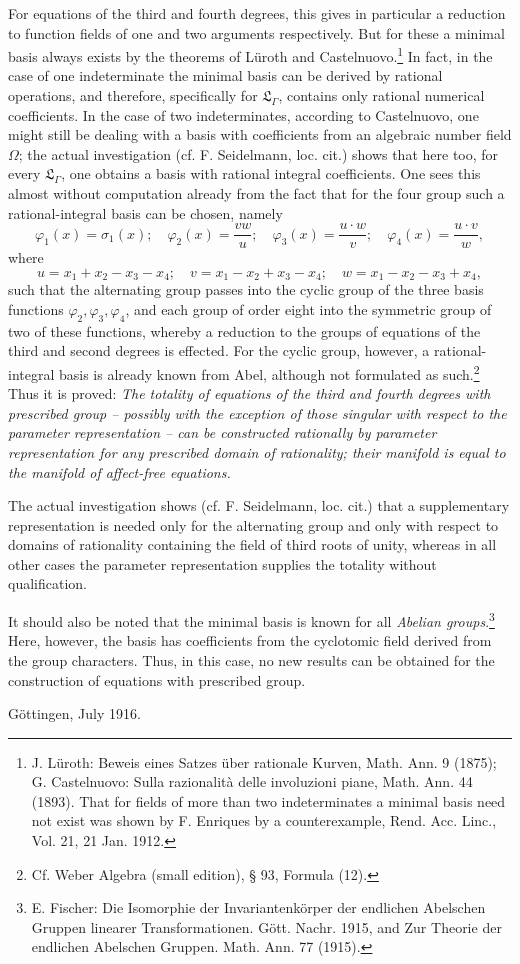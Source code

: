 \documentclass[11pt]{article}
\begin{document}
For equations of the third and fourth degrees, this gives in particular a reduction to function fields of one and two arguments respectively. But for these a minimal basis always exists by the theorems of Lüroth and Castelnuovo.\footnote{J. Lüroth: Beweis eines Satzes über rationale Kurven, Math. Ann. 9 (1875); G. Castelnuovo: Sulla razionalità delle involuzioni piane, Math. Ann. 44 (1893). That for fields of more than two indeterminates a minimal basis need not exist was shown by F. Enriques by a counterexample, Rend. Acc. Linc., Vol. 21, 21 Jan. 1912.} In fact, in the case of one indeterminate the minimal basis can be derived by rational operations, and therefore, specifically for $\mathfrak L_\Gamma$, contains only rational numerical coefficients. In the case of two indeterminates, according to Castelnuovo, one might still be dealing with a basis with coefficients from an algebraic number field $\Omega$; the actual investigation (cf. F. Seidelmann, loc. cit.) shows that here too, for every $\mathfrak L_\Gamma$, one obtains a basis with rational integral coefficients. One sees this almost without computation already from the fact that for the four group such a rational-integral basis can be chosen, namely
\[
\varphi_1(x)=\sigma_1(x);\quad \varphi_2(x)=\frac{v w}{u};\quad \varphi_3(x)=\frac{u\cdot w}{v};\quad \varphi_4(x)=\frac{u\cdot v}{w},
\]
where
\[
u=x_1+x_2-x_3-x_4;\quad v=x_1-x_2+x_3-x_4;\quad w=x_1-x_2-x_3+x_4,
\]
such that the alternating group passes into the cyclic group of the three basis functions $\varphi_2,\varphi_3,\varphi_4$, and each group of order eight into the symmetric group of two of these functions, whereby a reduction to the groups of equations of the third and second degrees is effected. For the cyclic group, however, a rational-integral basis is already known from Abel, although not formulated as such.\footnote{Cf. Weber Algebra (small edition), § 93, Formula (12).} Thus it is proved: \emph{The totality of equations of the third and fourth degrees with prescribed group -- possibly with the exception of those singular with respect to the parameter representation -- can be constructed rationally by parameter representation for any prescribed domain of rationality; their manifold is equal to the manifold of affect-free equations.}

The actual investigation shows (cf. F. Seidelmann, loc. cit.) that a supplementary representation is needed only for the alternating group and only with respect to domains of rationality containing the field of third roots of unity, whereas in all other cases the parameter representation supplies the totality without qualification.

It should also be noted that the minimal basis is known for all \emph{Abelian groups}.\footnote{E. Fischer: Die Isomorphie der Invariantenkörper der endlichen Abelschen Gruppen linearer Transformationen. Gött. Nachr. 1915, and Zur Theorie der endlichen Abelschen Gruppen. Math. Ann. 77 (1915).} Here, however, the basis has coefficients from the cyclotomic field derived from the group characters. Thus, in this case, no new results can be obtained for the construction of equations with prescribed group.

Göttingen, July 1916.
\end{document}
